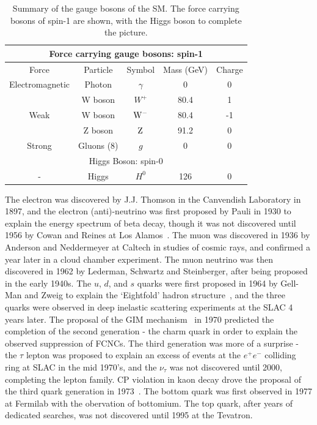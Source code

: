 \begin{table}[h]
\begin{tabular}[h]{c|cccc}	
\hline
\multicolumn{5}{c}{Force carrying gauge bosons: spin-1} \\ \hline
Force & Particle & Symbol & Mass (GeV) & Charge \\ \hline
Electromagnetic & Photon & $\gamma$ & 0 & 0 \\ 
\multirow{3}{*}{Weak} & W boson & $W^{+}$ & 80.4 & 1 \\
& W boson & $\mathrm{W}^{-}$ & 80.4 & -1 \\
& Z boson & $\mathrm{Z}$ & 91.2 & 0 \\
Strong & Gluons (8) & $g$ & 0 & 0 \\ \hline
\multicolumn{5}{c}{Higgs Boson: spin-0} \\ \hline
- & Higgs & $H^{0}$ & 126 & 0 \\ \hline
\end{tabular}
\caption{\label{tab:SMbosons}Summary of the gauge bosons of the \ac{SM}. The force carrying bosons of spin-1 are shown, with the Higgs boson to complete the picture.}
\end{table}
%
The electron was discovered by J.J. Thomson in the Canvendish Laboratory in 1897, and the electron (anti)-neutrino was first proposed by Pauli in 1930 to explain the energy spectrum of beta decay, though it was not discovered until 1956 by Cowan and Reines at Los Alamos~\cite{CowanReines}.
The muon was discovered in 1936 by Anderson and Neddermeyer at Caltech in studies of cosmic rays, and confirmed a year later in a cloud chamber experiment.
The muon neutrino was then discovered in 1962 by Lederman, Schwartz and Steinberger, after being proposed in the early 1940s.
The $u$, $d$, and $s$ quarks were first proposed in 1964 by Gell-Man and Zweig to explain the  `Eightfold' hadron structure~\cite{GellMann:1964nj,Zweig:1964jf},
and the three quarks were observed in deep inelastic scattering experiments at the \ac{SLAC} 4 years later.
The proposal of the GIM mechanism~\cite{PhysRevD.2.1285} in 1970 predicted the completion of the second generation - the charm quark in order to explain the observed suppression of \ac{FCNC}s. 
%
The third generation was more of a surprise - the $\tau$ lepton was proposed to explain an excess of events at the $e^{+}e^{-}$ colliding ring at \ac{SLAC} in the mid 1970's, and the $\nu_\tau$ was not discovered until 2000, completing the lepton family. 
CP violation in kaon decay drove the proposal of the third quark generation in 1973~\cite{Kobayashi01021973}.
The bottom quark was first observed in 1977 at Fermilab with the obervation of bottomium. 
The top quark, after years of dedicated searches, was not discovered until 1995 at the Tevatron.

